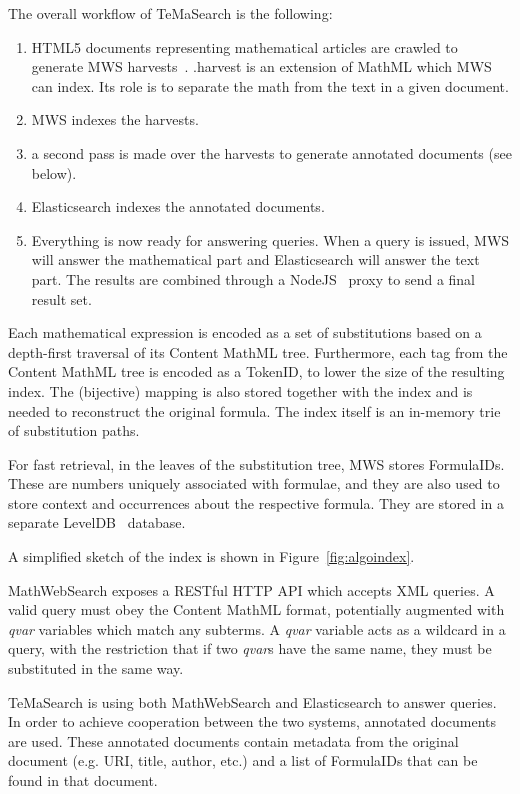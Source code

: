 \documentclass[a4paper,11pt,oneside]{article}
\def\MWS{\textsf{MWS}\xspace}
\def\mws{\textsf{MathWebSearch}\xspace}
\def\tms{\textsf{TeMaSearch}\xspace}
\def\els{\textsf{Elasticsearch}\xspace}
\def\cmml{\textsf{Content MathML}\xspace}
\def\xml{\textsf{XML}\xspace}
\def\mathml{\textsf{MathML}\xspace}
\begin{document}
The overall workflow of \tms is the following:
\begin{enumerate}
    \item HTML5 documents representing mathematical articles are
        crawled to generate \MWS harvests~\cite{mwsharvest:online}.
        \textsf{.harvest} is an extension of \mathml which \MWS can index. Its
        role is to separate the math from the text in a given document.
    \item \MWS indexes the harvests.
    \item a second pass is made over the harvests to generate annotated
        documents (see below).
    \item \els indexes the annotated documents.
    \item Everything is now ready for answering queries. When a query is
        issued, \MWS will answer the mathematical part and \els will answer the
        text part.  The results are combined through a
        NodeJS~\cite{nodejs:online} proxy to send a final result set.
\end{enumerate}

Each mathematical expression is encoded as a set of substitutions based
on a depth-first traversal of its \cmml tree.
Furthermore, each tag from the \cmml tree is encoded as a \textsf{TokenID},
to lower the size of the resulting index. The (bijective) mapping is also
stored together with the index and is needed to reconstruct the original
formula. The index itself is an in-memory trie of substitution paths.

For fast retrieval, in the leaves of the substitution tree, \MWS stores
\textsf{FormulaID}s. These are numbers uniquely associated with formulae,
and they are also used to store context and occurrences about the respective
formula. They are stored in a separate LevelDB~\cite{leveldb:online} database.

A simplified sketch of the index is shown in Figure~\ref{fig:algoindex}.

\mws exposes a RESTful HTTP API which accepts \xml queries.
A valid query must obey the \cmml format, potentially augmented with
\emph{qvar} variables which match any subterms.  A \emph{qvar} variable acts as
a wildcard in a query, with the restriction that if two \emph{qvar}s have the
same name, they must be substituted in the same way.

\tms is using both \mws and \els to answer queries.
In order to achieve cooperation between the two systems, annotated documents
are used. These annotated documents contain metadata from the original document
(e.g. URI, title, author, etc.) and a list of \textsf{FormulaID}s that can be
found in that document.
\end{document}
